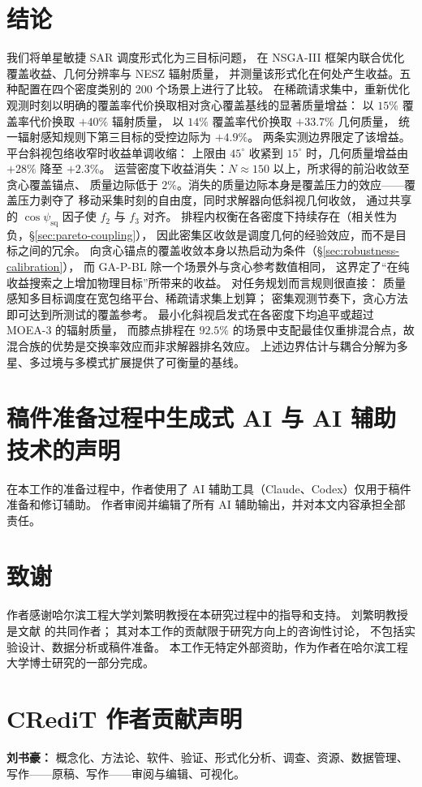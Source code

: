 \documentclass[preprint,12pt,authoryear]{elsarticle}
\begin{document}
\section{结论}
我们将单星敏捷 SAR 调度形式化为三目标问题，
在 NSGA-III 框架内联合优化覆盖收益、几何分辨率与 NESZ 辐射质量，
并测量该形式化在何处产生收益。五种配置在四个密度类别的 200 个场景上进行了比较。
在稀疏请求集中，重新优化观测时刻以明确的覆盖率代价换取相对贪心覆盖基线的显著质量增益：
以 $15\%$ 覆盖率代价换取 $+40\%$ 辐射质量，
以 $14\%$ 覆盖率代价换取 $+33.7\%$ 几何质量，
统一辐射感知规则下第三目标的受控边际为 $+4.9\%$。
两条实测边界限定了该增益。
平台斜视包络收窄时收益单调收缩：
上限由 $45^\circ$ 收紧到 $15^\circ$ 时，几何质量增益由 $+28\%$ 降至 $+2.3\%$。
运营密度下收益消失：$N \approx 150$ 以上，所求得的前沿收敛至贪心覆盖锚点、
质量边际低于 $2\%$。消失的质量边际本身是覆盖压力的效应——覆盖压力剥夺了
移动采集时刻的自由度，同时求解器向低斜视几何收敛，
通过共享的 $\cos\psi_{\text{sq}}$ 因子使 $f_2$ 与 $f_3$ 对齐。
排程内权衡在各密度下持续存在（相关性为负，\S\ref{sec:pareto-coupling}），
因此密集区收敛是调度几何的经验效应，而不是目标之间的冗余。
向贪心锚点的覆盖收敛本身以热启动为条件（\S\ref{sec:robustness-calibration}），
而 GA-P-BL 除一个场景外与贪心参考数值相同，
这界定了“在纯收益搜索之上增加物理目标”所带来的收益。
对任务规划而言规则很直接：
质量感知多目标调度在宽包络平台、稀疏请求集上划算；
密集观测节奏下，贪心方法即可达到所测试的覆盖参考。
最小化斜视启发式在各密度下均追平或超过 MOEA-3 的辐射质量，
而膝点排程在 $92.5\%$ 的场景中支配最佳仅重排混合点，故混合族的优势是交换率效应而非求解器排名效应。
上述边界估计与耦合分解为多星、多过境与多模式扩展提供了可衡量的基线。
\section*{稿件准备过程中生成式 AI 与 AI 辅助技术的声明}
在本工作的准备过程中，作者使用了 AI 辅助工具（Claude、Codex）仅用于稿件准备和修订辅助。
作者审阅并编辑了所有 AI 辅助输出，并对本文内容承担全部责任。
\section*{致谢}
作者感谢哈尔滨工程大学刘繁明教授在本研究过程中的指导和支持。
刘繁明教授是文献 \citet{Wu2026WhaleHighDensity} 的共同作者；
其对本工作的贡献限于研究方向上的咨询性讨论，
不包括实验设计、数据分析或稿件准备。
本工作无特定外部资助，作为作者在哈尔滨工程大学博士研究的一部分完成。
\section*{CRediT 作者贡献声明}
\textbf{刘书豪：} 概念化、方法论、软件、验证、形式化分析、调查、资源、数据管理、
写作——原稿、写作——审阅与编辑、可视化。
\end{document}
